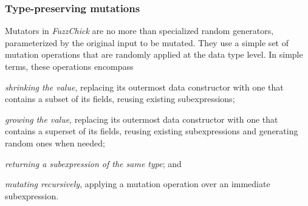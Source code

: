 \documentclass[sigconf, anonymous]{acmart}
\newcommand{\fuzzchick}{\textit{FuzzChick}\xspace}
\begin{document}
\begin{algorithm}
  \SetInd{0em}{0.75em}
  \SetAlgoLined
  \DontPrintSemicolon
\caption{\label{algo:fuzzchick:pick}\fuzzchick Seed Selection}
\end{algorithm}

\subsubsection{Type-preserving mutations}

Mutators in \fuzzchick are no more than specialized random generators,
parameterized by the original input to be mutated.
%
They use a simple set of mutation operations that are randomly applied at the
data type level.
%
In simple terms, these operations encompass
%
\begin{inparaenum}
\item \emph{shrinking the value}, replacing its outermost data constructor with
  one that contains a subset of its fields, reusing existing subexpressions;
\item \emph{growing the value}, replacing its outermost data constructor with
  one that contains a superset of its fields, reusing existing subexpressions
  and generating random ones when needed;
\item \emph{returning a subexpression of the same type}; and
\item \emph{mutating recursively}, applying a mutation operation over an
  immediate subexpression.
\end{inparaenum}
\end{document}
